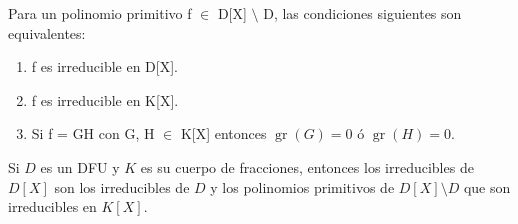 \begin{proposition}{}{}
Para un polinomio primitivo f $\in$ D[X] $\setminus$ D, las condiciones siguientes son equivalentes:

\begin{enumerate}
\item f es irreducible en D[X].
\item f es irreducible en K[X].
\item Si f = GH con G, H $\in$ K[X] entonces $\operatorname{gr}(G) = 0$ ó $\operatorname{gr}(H) = 0$.
\end{enumerate}
\end{proposition}

\begin{corollary}{}{}
Si $D$ es un DFU y $K$ es su cuerpo de fracciones, entonces los irreducibles de $D[X]$ son los irreducibles de $D$ y los polinomios primitivos de $D[X] \setminus D$ que son irreducibles en $K[X]$.
\end{corollary}
